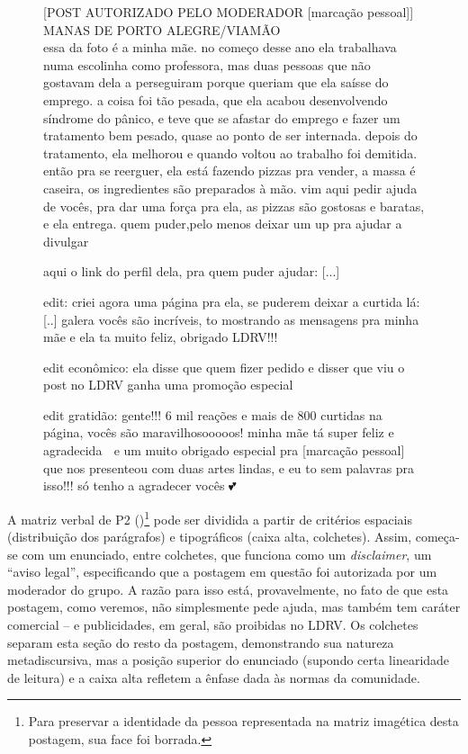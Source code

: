 \documentclass{textolivre}
\begin{document}
\begin{figure}[htbp]
\begin{minipage}{0.5\textwidth}
 [POST AUTORIZADO PELO MODERADOR [marcação pessoal]]\\
 MANAS DE PORTO ALEGRE/VIAMÃO\\
 
 essa da foto é a minha mãe. no começo desse ano ela trabalhava numa escolinha como professora, mas   duas pessoas que não gostavam dela a perseguiram porque queriam que ela saísse do emprego. a coisa foi tão pesada, que ela acabou desenvolvendo síndrome do pânico, e teve que se afastar do emprego e fazer um tratamento bem pesado, quase ao ponto de ser internada. depois do tratamento, ela melhorou  e quando voltou ao trabalho foi demitida. então pra se reerguer, ela está fazendo pizzas pra vender, a massa é caseira, os ingredientes são preparados à mão. vim aqui pedir ajuda de vocês, pra dar uma força pra ela, as pizzas são gostosas e baratas, e ela entrega. quem puder,pelo menos deixar um up pra ajudar a divulgar {\Symbola 💖}
 
 aqui o link do perfil dela, pra quem puder ajudar: [...]
 
 edit: criei agora uma página pra ela, se puderem deixar a curtida lá: [..] galera vocês são   incríveis, to mostrando as mensagens pra minha mãe e ela ta muito feliz, obrigado LDRV!!!
 
 edit econômico: ela disse que quem fizer pedido e disser que viu o post no LDRV ganha uma promoção especial {\Symbola 💖}
 
 edit gratidão: gente!!! 6 mil reações e mais de 800 curtidas na página, vocês são maravilhosooooos!
 minha mãe tá super feliz e agradecida {\Symbola 💖} e um muito obrigado especial pra [marcação pessoal] que nos presenteou com duas artes lindas, e eu to sem palavras pra isso!!! só tenho a agradecer vocês {\Symbola 💕}
 \end{minipage}
\end{figure}

A matriz verbal de P2 ()\footnote{Para preservar a identidade da pessoa representada na matriz imagética desta postagem, sua face foi borrada.} pode ser dividida a partir de critérios espaciais (distribuição dos parágrafos) e tipográficos (caixa alta, colchetes). Assim, começa-se com um enunciado, entre colchetes, que funciona como um \textit{disclaimer}, um “aviso legal”, especificando que a postagem em questão foi autorizada por um moderador do grupo. A razão para isso está, provavelmente, no fato de que esta postagem, como veremos, não simplesmente pede ajuda, mas também tem caráter comercial -- e publicidades, em geral, são proibidas no LDRV. Os colchetes separam esta seção do resto da postagem, demonstrando sua natureza metadiscursiva, mas a posição superior do enunciado (supondo certa linearidade de leitura) e a caixa alta refletem a ênfase dada às normas da comunidade.
\end{document}
